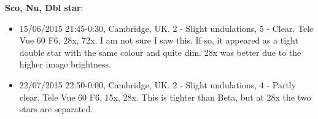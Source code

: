 {\bf Sco, Nu, Dbl star}:
\begin{itemize}
\item 15/06/2015 21:45-0:30, Cambridge, UK. 2 - Slight undulations, 5 - Clear. Tele Vue 60 F6, 28x, 72x. I am not sure I saw this. If so, it appeared as a tight double star with the same colour and quite dim. 28x was better due to the higher image brightness.
\item 22/07/2015 22:50-0:00, Cambridge, UK. 2 - Slight undulations, 4 - Partly clear. Tele Vue 60 F6, 15x, 28x. This is tighter than Beta, but at 28x the two stars are separated.
\end{itemize}
